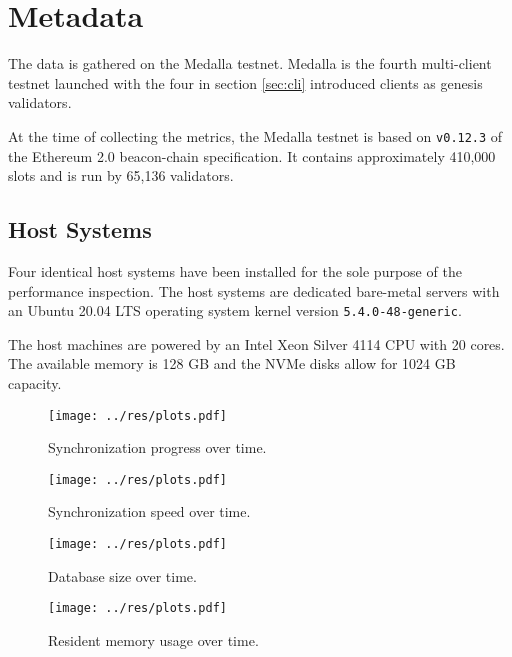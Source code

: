 \documentclass[twoside,twocolumn]{article}
\begin{document}
\section{Metadata}
The data is gathered on the Medalla testnet. Medalla is the fourth multi-client testnet launched with the four in section \ref{sec:cli} introduced clients as genesis validators.\par

At the time of collecting the metrics, the Medalla testnet is based on \texttt{v0.12.3} of the Ethereum 2.0 beacon-chain specification. It contains approximately 410,000 slots and is run by 65,136 validators.\par

\subsection{Host Systems}
Four identical host systems have been installed for the sole purpose of the performance inspection. The host systems are dedicated bare-metal servers with an Ubuntu 20.04 LTS operating system kernel version \texttt{5.4.0-48-generic}.\par

The host machines are powered by an Intel Xeon Silver 4114 CPU with 20 cores. The available memory is 128 GB and the NVMe disks allow for 1024 GB capacity.\par

\begin{figure}[t]
	\centering
	\texttt{[image: ../res/plots.pdf]}
	\caption{Synchronization progress over time.}
	\label{img:sync:prog}
\end{figure}

\begin{figure}[t]
	\centering
	\texttt{[image: ../res/plots.pdf]}
	\caption{Synchronization speed over time.}
	\label{img:sync:sped}
\end{figure}

\begin{figure}[t]
	\centering
	\texttt{[image: ../res/plots.pdf]}
	\caption{Database size over time.}
	\label{img:db}
\end{figure}

\begin{figure}[t]
	\centering
	\texttt{[image: ../res/plots.pdf]}
	\caption{Resident memory usage over time.}
	\label{img:mem}
\end{figure}
\end{document}
